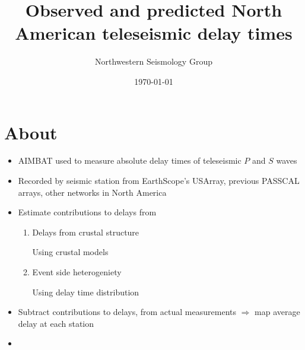 \documentclass[letterpaper,10pt]{article}
\title{Observed and predicted North American teleseismic delay times}
\author{Northwestern Seismology Group}
\date{\today}
\begin{document}
\maketitle


\section{About}

\begin{itemize}
  \item AIMBAT used to measure absolute delay times of teleseismic $P$ and $S$ waves 
  \item Recorded by seismic station from EarthScope's USArray, previous PASSCAL arrays, other networks in North America
  \item Estimate contributions to delays from
        \begin{enumerate}
          \item Delays from crustal structure

                Using crustal models
          \item Event side heterogeniety

                Using delay time distribution
        \end{enumerate}
  \item Subtract contributions to delays, from actual measurements $\Rightarrow$ map average delay at each station 
  \item 
\end{itemize}





















\end{document}
